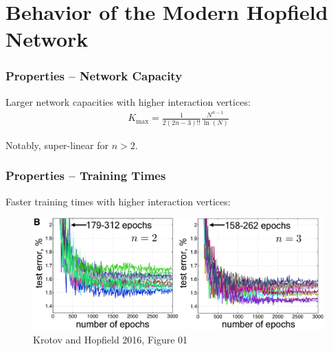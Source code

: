 
\section{Behavior of the Modern Hopfield Network}


\begin{frame}
	
\frametitle{Properties -- Network Capacity}

Larger network capacities with higher interaction vertices:
\begin{align}
    K_{\text{max}} = \frac{1}{2\left(2n-3\right)!!} \frac{N^{n-1}}{\ln(N)}
\end{align}

Notably, super-linear for \(n>2\).

\end{frame}


\begin{frame}
    \frametitle{Properties -- Training Times}

Faster training times with higher interaction vertices:
\begin{figure}
    \includegraphics[width=\textwidth]{images/trainingTimes.png}
    \caption{Krotov and Hopfield 2016, Figure 01}
\end{figure}
\end{frame}


